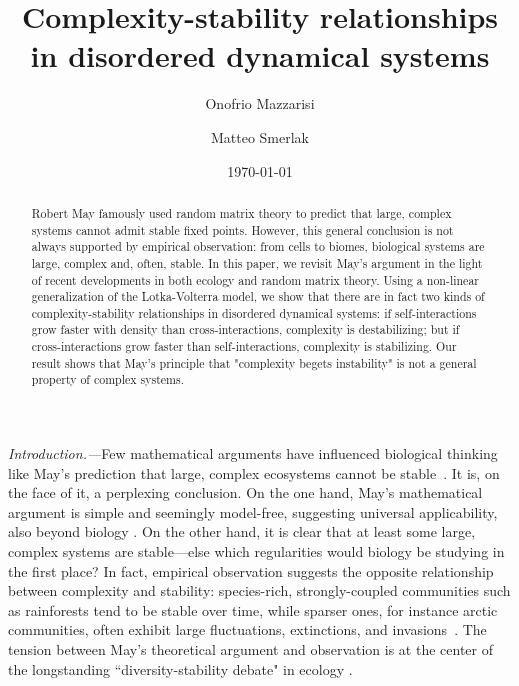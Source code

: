 \documentclass[
 prl,
 twocolumn,
 amsmath,
 amssymb,
 aps,
]{revtex4-2}
\begin{document}
\title{Complexity-stability relationships
in disordered dynamical systems}

\author{Onofrio Mazzarisi}

\author{Matteo Smerlak}


\date{\today}

\begin{abstract}
    Robert May famously used random matrix theory to predict that large, complex systems cannot admit stable fixed points. 
    However, this general conclusion is not always supported by empirical observation: from cells to biomes, biological systems are large, complex and, often, stable.
    In this paper, we revisit May's argument in the light of recent developments in both ecology and random matrix theory. 
    Using a non-linear generalization of the Lotka-Volterra model, we show that there are in fact two kinds of complexity-stability relationships in disordered dynamical systems: 
    if self-interactions grow faster with density than cross-interactions, complexity is destabilizing; but if cross-interactions grow faster than self-interactions, complexity is stabilizing.
    Our result shows that May's principle that "complexity begets instability" is not a general property of complex systems.
\end{abstract}

\maketitle

\paragraph*{}
\emph{Introduction.---}Few mathematical arguments have influenced biological thinking like May's prediction that large, complex ecosystems cannot be stable~\cite{May1972}.
It is, on the face of it, a perplexing conclusion.
On the one hand, May's mathematical argument is simple and seemingly model-free, suggesting universal applicability, also beyond biology \cite{Haldane2011, Moran2019}.
On the other hand, it is clear that at least some large, complex systems are stable---else which regularities would biology be studying in the first place? 
In fact, empirical observation suggests the opposite relationship between complexity and stability: species-rich, strongly-coupled communities such as rainforests tend to be stable over time, while sparser ones, for instance arctic communities, often exhibit large fluctuations, extinctions, and invasions~\cite{Hutchinson1959,Odum1959,MacArthur1955}. 
The tension between May's theoretical argument and observation is at the center of the longstanding ``diversity-stability debate" in ecology \cite{McCann2000, Loreau2022}.
\end{document}
